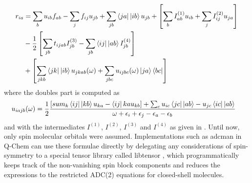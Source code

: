 \begin{align}
\begin{split}
r_{ia} &= \sum_b u_{ib} f_{ab} - \sum_j f_{ij} u_{jb} + \sum_{jb} \sbra{ja}\sket{ib} u_{jb} + \left[ \sum_b I^{(1)}_{ab} u_{ib} + \sum_j I^{(2)}_{ij} u_{ja}\right] \\
&- \frac{1}{2} \left[ \sum_{jb} t_{ijab} I^{(3)}_{jb} - \sum_{jb} \sbra{ij}\sket{ab} I^{(4)}_{jb} \right] \\
&+ \left[\sum_{jkb} \sbra{jk}\sket{ib} u_{jkab}(\omega) + \sum_{jbc} u_{ijbc}(\omega) \sket{ja}\sbra{bc}\right]
\end{split}
\end{align}
\noindent where the doubles part is computed as
\begin{align}
u_{iajb}(\omega) &= \frac{1}{2} \frac{\left[sum_k \sbra{ij}\sket{kb}u_{ka} - \sbra{ij}{ka} u_{kb}\right] + \sum_c u_{ic} \sbra{jc}\sket{ab} - u_{jc} \sbra{ic}\sket{ab}}{\omega + \eps_i + \eps_j - \eps_a - \eps_b}
\end{align}
\noindent and with the intermediates $I^{(1)}$, $I^{(2)}$, $I^{(3)}$ and $I^{(4)}$ as given in \cite{Wor2009}. Until now, only spin molecular orbitals were assumed. Implementations such as adcman in Q-Chem \cite{Sha2006} can use these formulae directly by delegating any considerations of spin-symmetry to a special tensor library called libtensor \cite{Epi2013}, which programmatically keeps track of the non-vanishing spin block components and reduces the expressions to the restricted ADC(2) equations for closed-shell molecules.

